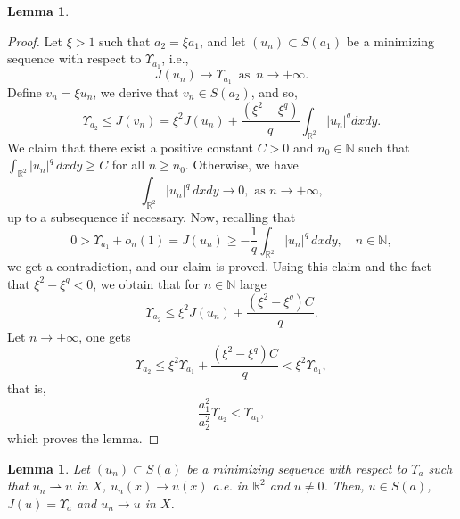 \documentclass[11pt]{amsart}
\newtheorem{lemma}[theorem]{Lemma}
\numberwithin{equation}{section}
\begin{document}
{{{\begin{lemma}
\end{lemma}
\begin{proof} Let $\xi>1$ such that $a_2=\xi a_1$, and let $(u_n) \subset S(a_1)$ be a minimizing sequence with respect to $\Upsilon_{a_1}$, i.e.,
$$
J(u_n) \to \Upsilon_{a_1}\, \,\,\text{as}\,\,
\, n \to +\infty.
$$
Define $v_n={\xi}{u_n}$, we derive that $v_n \in S(a_2)$, and so,
\begin{equation}
    \Upsilon_{a_2} \leq J\left(v_n\right)=\xi^2 J\left(u_n\right)+\frac{\left(\xi^2-\xi^q\right)}{q} \int_{\mathbb{R}^2}\left|u_n\right|^q d x d y .
\end{equation}
We claim that there exist a positive constant $C>0$ and $n_0\in \mathbb{N}$ such that $\displaystyle \int_{\mathbb{R}^2}|u_n|^q\,dxdy \geq C$ for all $n\geq n_0 $.
Otherwise, we have
$$
\int_{\mathbb{R}^2}|u_n|^q\,dxdy \to 0,  \,\,\text{as}\,\,n \to +\infty,
$$
up to a subsequence if necessary. Now, recalling that
$$
0>\Upsilon_{a_1}+o_n(1)=J(u_n)\geq -\frac{1}{q}\int_{\mathbb{R}^2}|u_n|^q\,dxdy, \quad n \in \mathbb{N},
$$
we get a contradiction, and our claim is proved.
Using this claim and the fact that $\xi^2-\xi^q<0$, we obtain that for $n\in \mathbb{N}$ large
$$
\Upsilon_{a_2}\leq \xi^2 J(u_n)+\frac{(\xi^{2}-\xi^q)C}{q}.
$$
Let $n \to +\infty$, one gets
$$
\Upsilon_{a_2}\leq \xi^2 \Upsilon_{a_1}+\frac{(\xi^{2}-\xi^q)C}{q}<\xi^2\Upsilon_{a_1},
$$
that is,
$$
\frac{a_1^2}{a_2^2}\Upsilon_{a_2}<\Upsilon_{a_1},
$$
which proves the lemma.
\end{proof}
\begin{lemma} \label{C2} Let $(u_n)\subset S(a)$ be a minimizing sequence with respect to $\Upsilon_{a}$ such that  $u_n \rightharpoonup u$ in $X$, \linebreak $u_n(x) \to u(x)$ a.e. in $\mathbb{R}^2$ and $u \not=0 $. Then, $u \in S(a)$, $J(u)=\Upsilon_a$ and $u_n \to u$ in $X$.


\end{lemma}}}}
\end{document}
